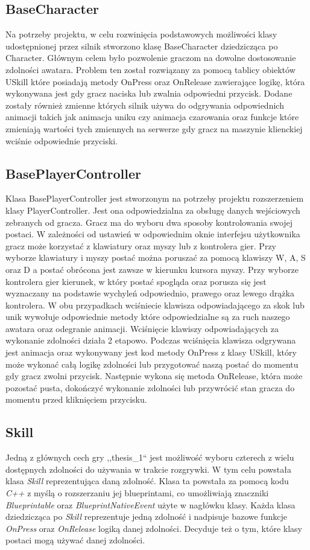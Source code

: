 \documentclass[multip]{SGGW-thesis}
\begin{document}
	\subsection{BaseCharacter}
	Na potrzeby projektu, w celu rozwinięcia podstawowych możliwości klasy udostępnionej przez silnik stworzono klasę BaseCharacter dziedzicząca po Character. Głównym celem było pozwolenie graczom na dowolne dostosowanie zdolności awatara. Problem ten został rozwiązany za pomocą tablicy obiektów USkill które posiadają metody OnPress oraz OnRelease zawierające logikę, która wykonywana jest gdy gracz naciska lub zwalnia odpowiedni przycisk.		
	Dodane zostały również zmienne których silnik używa do odgrywania odpowiednich animacji takich jak animacja uniku czy animacja czarowania oraz funkcje które zmieniają wartości tych zmiennych na serwerze gdy gracz na maszynie klienckiej wciśnie odpowiednie przyciski.
	\subsection{BasePlayerController}
	Klasa BasePlayerController jest stworzonym na potrzeby projektu rozszerzeniem klasy PlayerController. Jest ona odpowiedzialna za obsługę danych wejściowych zebranych od gracza. 
Gracz ma do wyboru dwa sposoby kontrolowania swojej postaci. W zależności od ustawień w odpowiednim oknie interfejsu użytkownika gracz może korzystać z klawiatury oraz myszy lub z kontrolera gier. Przy wyborze klawiatury i myszy postać można poruszać za pomocą klawiszy W, A, S oraz D a postać obrócona jest zawsze w kierunku kursora myszy.  Przy wyborze kontrolera gier kierunek, w który postać spogląda oraz porusza się jest wyznaczany na podstawie wychyleń odpowiednio, prawego oraz lewego drążka kontrolera. W obu przypadkach wciśniecie klawisza odpowiadającego za skok lub unik wywołuje odpowiednie metody które odpowiedzialne są za ruch naszego awatara oraz odegranie animacji. Wciśnięcie klawiszy odpowiadających za wykonanie zdolności działa 2 etapowo. Podczas wciśnięcia klawisza odgrywana jest animacja oraz wykonywany jest kod metody OnPress z klasy USkill, który może wykonać całą logikę zdolności lub przygotować naszą postać do momentu gdy gracz zwolni przycisk. Następnie wykona się metoda OnRelease, która może pozostać pusta, dokończyć wykonanie zdolności lub przywrócić stan gracza do momentu przed kliknięciem przycisku.
	\subsection{Skill}
	Jedną z głównych cech gry ,,thesis\_1`` jest możliwość wyboru czterech z wielu dostępnych zdolności do używania w trakcie rozgrywki. W tym celu powstała klasa {\em Skill} reprezentująca daną zdolność. Klasa ta powstała za pomocą kodu {\em C++} z myślą o rozszerzaniu jej blueprintami, co umożliwiają znaczniki {\em Blueprintable} oraz {\em BlueprintNativeEvent} użyte w nagłówku klasy. Każda klasa dziedzicząca po {\em Skill} reprezentuje jedną zdolność i nadpisuje bazowe funkcje {\em OnPress} oraz {\em OnRelease} logiką danej zdolności. Decyduje też o tym, które klasy postaci mogą używać danej zdolności.
\end{document}
